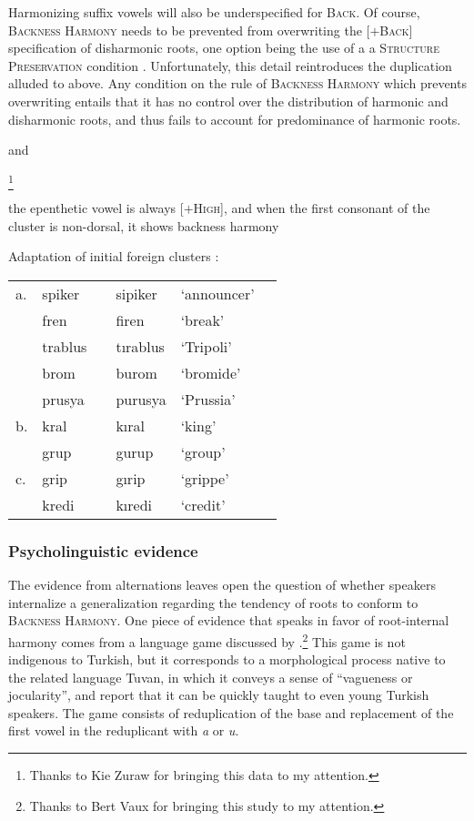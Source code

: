 \noindent
Harmonizing suffix vowels will also be underspecified for \textsc{Back}. Of course, \textsc{Backness Harmony} needs to be prevented from overwriting the [$+$\textsc{Back}] specification of disharmonic roots, one option being the use of a a \textsc{Structure Preservation} condition \citep{Kiparsky1985}. Unfortunately, this detail reintroduces the duplication alluded to above. Any condition on the rule of \textsc{Backness Harmony} which prevents overwriting entails that it has no control over the distribution of harmonic and disharmonic roots, and thus fails to account for predominance of harmonic roots.

\citet{Clements1982} and \citet{Kaun1999}

\footnote{Thanks to Kie Zuraw for bringing this data to my attention.}

the epenthetic vowel is always [$+$\textsc{High}], and when the first consonant of the cluster is non-dorsal, it shows backness harmony

\begin{example}
Adaptation of initial foreign clusters \citep[][247]{Clements1982}: 

\vspace{0.5\baselineskip}
\begin{tabular}{l l l l l l}
a. & spiker  & \alt{} & sipiker  & `announcer' \\
   & fren    & \alt{} & firen    & `break'     \\
   & trablus & \alt{} & tırablus & `Tripoli'   \\
   & brom    & \alt{} & burom    & `bromide'   \\
   & prusya  & \alt{} & purusya  & `Prussia'   \\
b. & kral    & \alt{} & kıral    & `king'      \\
   & grup    & \alt{} & gurup    & `group'     \\
c. & grip    & \alt{} & gırip    & `grippe'    \\ %
   & kredi   & \alt{} & kıredi   & `credit'    \\
\end{tabular}
\end{example}

\subsubsection{Psycholinguistic evidence}

The evidence from alternations leaves open the question of whether speakers internalize a generalization regarding the tendency of roots to conform to \textsc{Backness Harmony}. One piece of evidence that speaks in favor of root-internal harmony comes from a language game discussed by \citet{Harrison2001}.\footnote{Thanks to Bert Vaux for bringing this study to my attention.} This game is not indigenous to Turkish, but it corresponds to a morphological process native to the related language Tuvan, in which it conveys a sense of ``vagueness or jocularity'', and \citeauthor{Harrison2001} report that it can be quickly taught to even young Turkish speakers. The game consists of reduplication of the base and replacement of the first vowel in the reduplicant with \emph{a} or \emph{u}. 

